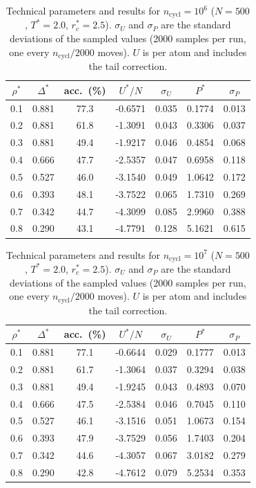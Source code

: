 \begin{table}[H]\centering\small
\caption{Technical parameters and results for $n_{\mathrm{cycl}}=10^6$ ($N=500$, $T^*=2.0$, $r_c^*=2.5$). $\sigma_U$ and $\sigma_P$ are the standard deviations of the sampled values (2000 samples per run, one every $n_{\mathrm{cycl}}/2000$ moves). $U$ is per atom and includes the tail correction.}
\label{tab:n1000000}
\begin{tabular}{ccccccc}\hline
$\rho^*$ & $\Delta^*$ & acc.\ (\%) & $U^*/N$ & $\sigma_U$ & $P^*$ & $\sigma_P$ \\ \hline
0.1 & 0.881 & 77.3 & -0.6571 & 0.035 & 0.1774 & 0.013 \\
0.2 & 0.881 & 61.8 & -1.3091 & 0.043 & 0.3306 & 0.037 \\
0.3 & 0.881 & 49.4 & -1.9217 & 0.046 & 0.4854 & 0.068 \\
0.4 & 0.666 & 47.7 & -2.5357 & 0.047 & 0.6958 & 0.118 \\
0.5 & 0.527 & 46.0 & -3.1540 & 0.049 & 1.0642 & 0.172 \\
0.6 & 0.393 & 48.1 & -3.7522 & 0.065 & 1.7310 & 0.269 \\
0.7 & 0.342 & 44.7 & -4.3099 & 0.085 & 2.9960 & 0.388 \\
0.8 & 0.290 & 43.1 & -4.7791 & 0.128 & 5.1621 & 0.615 \\
\hline\end{tabular}\end{table}
\begin{table}[H]\centering\small
\caption{Technical parameters and results for $n_{\mathrm{cycl}}=10^7$ ($N=500$, $T^*=2.0$, $r_c^*=2.5$). $\sigma_U$ and $\sigma_P$ are the standard deviations of the sampled values (2000 samples per run, one every $n_{\mathrm{cycl}}/2000$ moves). $U$ is per atom and includes the tail correction.}
\label{tab:n10000000}
\begin{tabular}{ccccccc}\hline
$\rho^*$ & $\Delta^*$ & acc.\ (\%) & $U^*/N$ & $\sigma_U$ & $P^*$ & $\sigma_P$ \\ \hline
0.1 & 0.881 & 77.1 & -0.6644 & 0.029 & 0.1777 & 0.013 \\
0.2 & 0.881 & 61.7 & -1.3064 & 0.037 & 0.3294 & 0.038 \\
0.3 & 0.881 & 49.4 & -1.9245 & 0.043 & 0.4893 & 0.070 \\
0.4 & 0.666 & 47.5 & -2.5384 & 0.046 & 0.7045 & 0.110 \\
0.5 & 0.527 & 46.1 & -3.1516 & 0.051 & 1.0673 & 0.154 \\
0.6 & 0.393 & 47.9 & -3.7529 & 0.056 & 1.7403 & 0.204 \\
0.7 & 0.342 & 44.6 & -4.3057 & 0.067 & 3.0182 & 0.279 \\
0.8 & 0.290 & 42.8 & -4.7612 & 0.079 & 5.2534 & 0.353 \\
\hline\end{tabular}\end{table}
